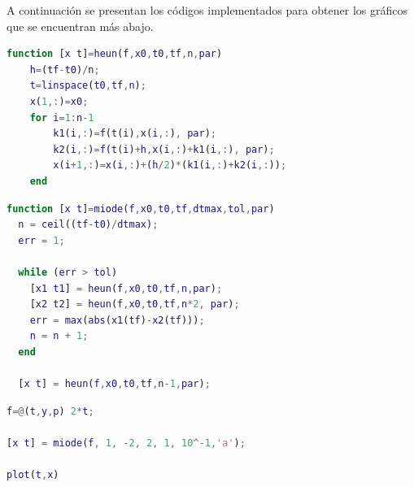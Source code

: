 A continuaci\'on se presentan los c\'odigos implementados para obtener los gr\'aficos que se encuentran m\'as abajo.

\begin{lstlisting}[language=Matlab, caption=heun.m]
function [x t]=heun(f,x0,t0,tf,n,par)
    h=(tf-t0)/n;
    t=linspace(t0,tf,n);
    x(1,:)=x0;
    for i=1:n-1
        k1(i,:)=f(t(i),x(i,:), par);
        k2(i,:)=f(t(i)+h,x(i,:)+k1(i,:), par);
        x(i+1,:)=x(i,:)+(h/2)*(k1(i,:)+k2(i,:));
    end
\end{lstlisting}

\begin{lstlisting}[language=Matlab, caption=miode.m]
function [x t]=miode(f,x0,t0,tf,dtmax,tol,par)
  n = ceil((tf-t0)/dtmax);
  err = 1;
  
  while (err > tol)
    [x1 t1] = heun(f,x0,t0,tf,n,par); 
    [x2 t2] = heun(f,x0,t0,tf,n*2, par);
    err = max(abs(x1(tf)-x2(tf)));
    n = n + 1;
  end
  
  [x t] = heun(f,x0,t0,tf,n-1,par); 
\end{lstlisting}

\begin{lstlisting}[language=Matlab, caption=ejemplo.m]
f=@(t,y,p) 2*t;

[x t] = miode(f, 1, -2, 2, 1, 10^-1,'a');

plot(t,x)
\end{lstlisting}

